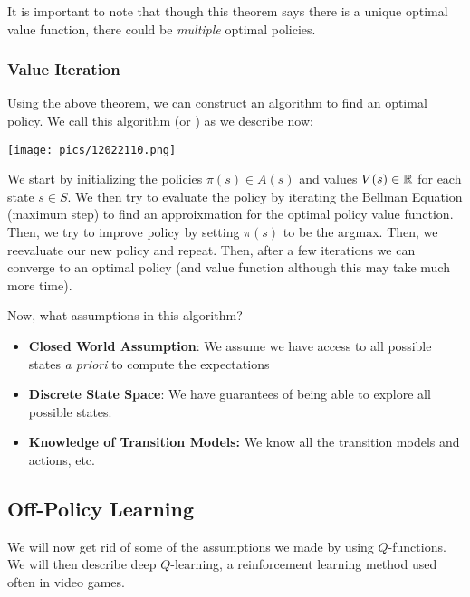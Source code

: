 \documentclass[11pt]{scrartcl}
\begin{document}
It is important to note that though this theorem says there is a unique optimal value function, there could be \textit{multiple} optimal policies.

\subsubsection{Value Iteration}
Using the above theorem, we can construct an algorithm to find an optimal policy. We call this algorithm  (or ) as we describe now:
\begin{center}
    \texttt{[image: pics/12022110.png]}
\end{center}
We start by initializing the policies $\pi(s) \in A(s)$ and values $V(s) \in \mathbb{R}$ for each state $s \in S$. We then try to evaluate the policy by iterating the Bellman Equation (maximum step) to find an approixmation for the optimal policy value function. Then, we try to improve policy by setting $\pi(s)$ to be the argmax. Then, we reevaluate our new policy and repeat. Then, after a few iterations we can converge to an optimal policy (and value function although this may take much more time). 

Now, what assumptions in this algorithm? 
\begin{itemize}
    \item \textbf{Closed World Assumption}: We assume we have access to all possible states \textit{a priori} to compute the expectations
    \item \textbf{Discrete State Space}: We have guarantees of being able to explore all possible states.
    \item \textbf{Knowledge of Transition Models:} We know all the transition models and actions, etc.
\end{itemize}

\subsection{Off-Policy Learning}
We will now get rid of some of the assumptions we made by using $Q$-functions. We will then describe deep $Q$-learning, a reinforcement learning method used often in video games.
\end{document}
